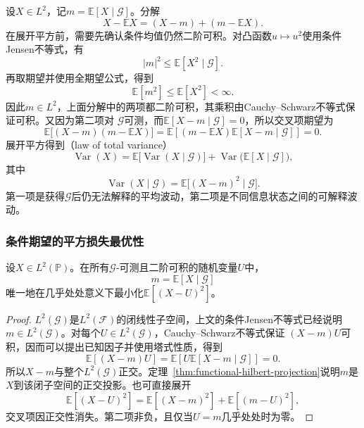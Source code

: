 设\(X\in L^2\)，记\(m=\mathbb{E}[X\mid\mathcal{G}]\)。分解
\[ X-\mathbb{E}X=(X-m)+(m-\mathbb{E}X). \]
在展开平方前，需要先确认条件均值仍然二阶可积。对凸函数\(u\mapsto u^2\)使用条件
Jensen不等式，有
\[
  |m|^2
  \leq
  \mathbb{E}[X^2\mid\mathcal{G}].
\]
再取期望并使用全期望公式，得到
\[
  \mathbb{E}[m^2]\leq\mathbb{E}[X^2]<\infty.
\]
因此\(m\in L^2\)，上面分解中的两项都二阶可积，其乘积由Cauchy--Schwarz不等式保证可积。又因为第二项对
\(\mathcal{G}\)可测，而\(\mathbb{E}[X-m\mid\mathcal{G}]=0\)，所以交叉项期望为
\[ \mathbb{E}\bigl[(X-m)(m-\mathbb{E}X)\bigr]
  =\mathbb{E}\left[(m-\mathbb{E}X)\mathbb{E}[X-m\mid\mathcal{G}]\right]=0. \]
展开平方得到（law of total variance）
\begin{equation}
  \operatorname{Var}(X)
  =
  \mathbb{E}\bigl[\operatorname{Var}(X\mid\mathcal{G})\bigr]
  +
  \operatorname{Var}\bigl(\mathbb{E}[X\mid\mathcal{G}]\bigr),
  \label{eq:probability-total-variance}
\end{equation}
其中
\[ \operatorname{Var}(X\mid\mathcal{G})
  =\mathbb{E}\bigl[(X-m)^2\mid\mathcal{G}\bigr]. \]
第一项是获得\(\mathcal{G}\)后仍无法解释的平均波动，第二项是不同信息状态之间的可解释波动。

\subsubsection{条件期望的平方损失最优性}

\begin{theorem}[条件均值的平方损失最优性]
\label{thm:probability-conditional-mean-l2-projection}
设\(X\in L^2(\mathbb{P})\)。在所有\(\mathcal{G}\)-可测且二阶可积的随机变量\(U\)中，
\[ m=\mathbb{E}[X\mid\mathcal{G}] \]
唯一地在几乎处处意义下最小化\(\mathbb{E}[(X-U)^2]\)。
\end{theorem}

\begin{proof}
\(L^2(\mathcal{G})\)是\(L^2(\mathcal{F})\)的闭线性子空间，上文的条件Jensen不等式已经说明
\(m\in L^2(\mathcal{G})\)。对每个\(U\in L^2(\mathcal{G})\)，Cauchy--Schwarz不等式保证
\((X-m)U\)可积，因而可以提出已知因子并使用塔式性质，得到
\[ \mathbb{E}[(X-m)U]
  =\mathbb{E}\left[U\mathbb{E}[X-m\mid\mathcal{G}]\right]=0. \]
所以\(X-m\)与整个\(L^2(\mathcal{G})\)正交。定理~\ref{thm:functional-hilbert-projection}说明\(m\)是\(X\)到该闭子空间的正交投影。也可直接展开
\begin{equation}
  \mathbb{E}[(X-U)^2]
  =
  \mathbb{E}[(X-m)^2]
  +
  \mathbb{E}[(m-U)^2],
  \label{eq:probability-pythagorean-prediction}
\end{equation}
交叉项因正交性消失。第二项非负，且仅当\(U=m\)几乎处处时为零。
\end{proof}

